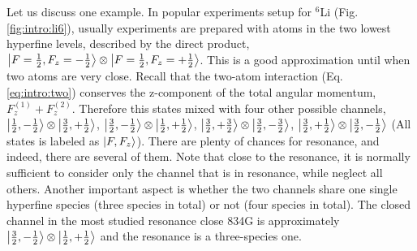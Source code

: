 Let us discuss one example.  In popular experiments setup for $^{6}$Li (Fig. \ref{fig:intro:li6}), usually experiments are prepared with atoms in the two lowest hyperfine levels, described by the  direct product, $\left|F=\frac{1}{2},F_{z}=-\frac{1}{2}\right>\otimes\left|F=\frac{1}{2},F_{z}=+\frac{1}{2}\right>$.  This is a good approximation until when two atoms are very close.  Recall that the two-atom interaction (Eq. \ref{eq:intro:two}) conserves the z-component of the total angular momentum, $F_{z}^{(1)}+F_{z}^{(2)}$.  Therefore this states mixed with four other possible channels, $\left|\frac{1}{2},-\frac{1}{2}\right>\otimes\left|\frac{3}{2},+\frac{1}{2}\right>$, $\left|\frac{3}{2},-\frac{1}{2}\right>\otimes\left|\frac{1}{2},+\frac{1}{2}\right>$, $\left|\frac{3}{2},+\frac{3}{2}\right>\otimes\left|\frac{3}{2},-\frac{3}{2}\right>$, $\left|\frac{3}{2},+\frac{1}{2}\right>\otimes\left|\frac{3}{2},-\frac{1}{2}\right>$ (All states is labeled as $\left|F,F_{z}\right>$).  There are plenty of chances for resonance, and indeed, there are several of them.  Note that close to the resonance, it is normally sufficient to consider only the  channel that is in resonance, while neglect all others.  Another important aspect is whether the two channels share one single hyperfine species (three species in total) or not (four species in total).   The closed channel in the most studied resonance close 834G is approximately $\left|\frac{3}{2},-\frac{1}{2}\right>\otimes\left|\frac{1}{2},+\frac{1}{2}\right>$ and the resonance is a three-species one\cite{ZhangThesis,ChinRMP}. 

